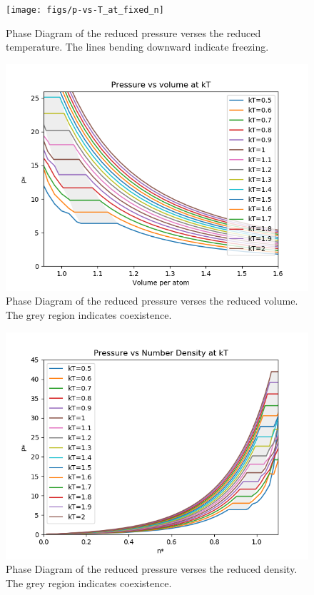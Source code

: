 \documentclass[letterpaper,twocolumn,amsmath,amssymb,prb]{revtex4-1}
\begin{document}
\begin{figure}
 \begin{center}
  \texttt{[image: figs/p-vs-T\_at\_fixed\_n]}
 \end{center}
\caption{Phase Diagram of the reduced pressure verses the reduced temperature. The lines bending downward indicate freezing.}
\label{fig:p-vs-T_at_fixed_density}
\end{figure}

\begin{figure}
 \begin{center}
  \includegraphics[width=\columnwidth]{figs/p-vs-V_at_fixed_T}
 \end{center}
\caption{Phase Diagram of the reduced pressure verses the reduced volume. The grey region indicates coexistence.}
\label{fig:p-vs-V_at_fixed_T}
\end{figure}

\begin{figure}
 \begin{center}
  \includegraphics[width=\columnwidth]{figs/p-vs-n_at_fixed_T}
 \end{center}
\caption{Phase Diagram of the reduced pressure verses the reduced density. The grey region indicates coexistence.}
\label{fig:p-vs-n_at_fixed_T}
\end{figure}
\end{document}
